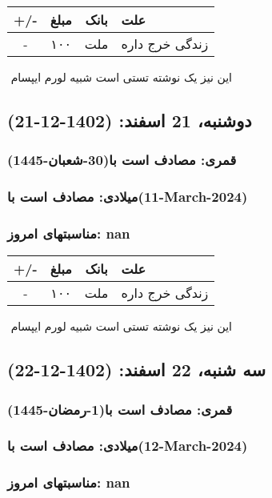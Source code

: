 \documentclass{article}
\newcommand{\rnote}[1]{\marginpar{\textcolor{color}{\StrSubstitute{\##1}{ }{\_}}}}
\newcommand{\myRow}[4]{
    #1 & #2 & #3 & #4 \\ \hline
}
\begin{document}
\begin{tabular}{ | c | c | c | p{5cm} |}
    \hline
    \myRow{ +/- }{مبلغ}{بانک}{علت}
    \myRow{-}{۱۰۰}{ملت}{زندگی خرج داره}
\end{tabular}
\newline
\newline

‌
\rnote{تست}
این نیز یک نوشته تستی است شبیه لورم ایپسام




\newpage
{}
\textcolor{color}{
\section{ دوشنبه، 21 اسفند: (1402-12-21) }
\subsubsection*{قمری: مصادف است با(30-شعبان-1445)} 
\subsubsection*{میلادی: مصادف است با(11-March-2024)}
\subsubsection*{مناسبتهای امروز: nan}
}


\begin{tabular}{ | c | c | c | p{5cm} |}
    \hline
    \myRow{ +/- }{مبلغ}{بانک}{علت}
    \myRow{-}{۱۰۰}{ملت}{زندگی خرج داره}
\end{tabular}
\newline
\newline

‌
\rnote{تست}
این نیز یک نوشته تستی است شبیه لورم ایپسام




\newpage
{}
\textcolor{color}{
\section{ سه شنبه، 22 اسفند: (1402-12-22) }
\subsubsection*{قمری: مصادف است با(1-رمضان-1445)} 
\subsubsection*{میلادی: مصادف است با(12-March-2024)}
\subsubsection*{مناسبتهای امروز: nan}
}
\end{document}
